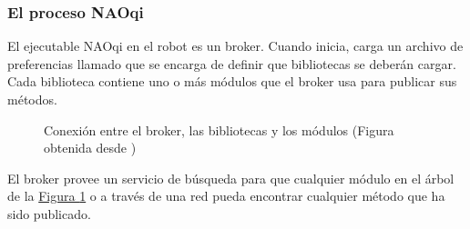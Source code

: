 






\subsubsection{El proceso NAOqi}
\label{\detokenize{chapter_one/naoqi:el-proceso-naoqi}}
El ejecutable NAOqi en el robot es un broker.
Cuando inicia, carga un archivo de
preferencias llamado  que se encarga de definir que bibliotecas
se deberán cargar. Cada biblioteca contiene uno o más módulos que el broker usa
para publicar sus métodos.

\begin{figure}[htbp]
\centering
\capstart
\noindent{}
\caption{Conexión entre el broker, las bibliotecas y los módulos (Figura obtenida desde \cite{brokerlibrariesmodules})}\label{\detokenize{chapter_one/naoqi:broker-lib-mod}}\end{figure}

El broker provee un servicio de búsqueda para que cualquier módulo en el árbol
de la \hyperref[\detokenize{chapter_one/naoqi:broker-lib-mod}]{Figura \ref{\detokenize{chapter_one/naoqi:broker-lib-mod}}} o a través de una red pueda encontrar cualquier
método que ha sido publicado.

